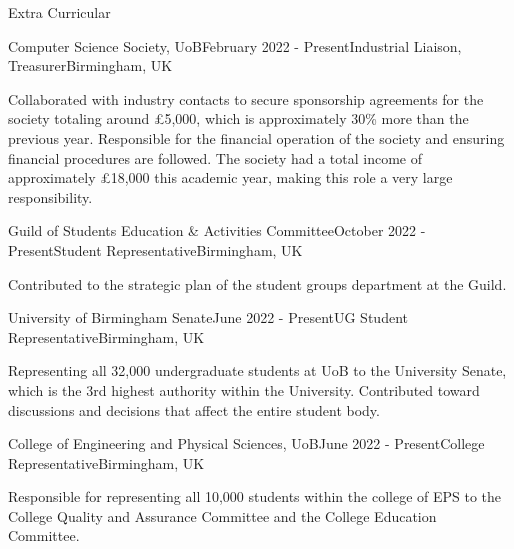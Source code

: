 \documentclass{resume} %
\begin{document}
\begin{rSection}{Extra Curricular}


\begin{rSubsection}{Computer Science Society, UoB}{February 2022 - Present}{Industrial Liaison, Treasurer}{Birmingham, UK}
\item Collaborated with industry contacts to secure sponsorship agreements for the society totaling around £5,000, which is approximately 30\% more than the previous year. Responsible for the financial operation of the society and ensuring financial procedures are followed. The society had a total income of approximately £18,000 this academic year, making this role a very large responsibility.
\end{rSubsection}

\begin{rSubsection}{Guild of Students Education \& Activities Committee}{October 2022 - Present}{Student Representative}{Birmingham, UK}
\item Contributed to the strategic plan of the student groups department at the Guild.
\end{rSubsection}

\begin{rSubsection}{University of Birmingham Senate}{June 2022 - Present}{UG Student Representative}{Birmingham, UK}
\item Representing all 32,000 undergraduate students at UoB to the University Senate, which is the 3rd highest authority within the University. Contributed toward discussions and decisions that affect the entire student body.
\end{rSubsection}

\begin{rSubsection}{College of Engineering and Physical Sciences, UoB}{June 2022 - Present}{College Representative}{Birmingham, UK}
\item Responsible for representing all 10,000 students within the college of EPS to the College Quality and Assurance Committee and the College Education Committee.
\end{rSubsection}


\end{rSection}
\end{document}
